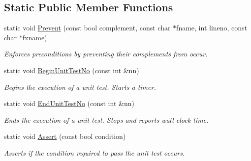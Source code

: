 \subsection*{Static Public Member Functions}
\begin{DoxyCompactItemize}
\item 
static void \hyperlink{classmtk_1_1Tools_afe5bb096309258e2e72503fd7b41c7e0}{Prevent} (const bool complement, const char $\ast$fname, int lineno, const char $\ast$fxname)
\begin{DoxyCompactList}\small\item\em Enforces preconditions by preventing their complements from occur. \end{DoxyCompactList}\item 
static void \hyperlink{classmtk_1_1Tools_a26ee906d28523378522a75e25c3a4e19}{Begin\+Unit\+Test\+No} (const int \&nn)
\begin{DoxyCompactList}\small\item\em Begins the execution of a unit test. Starts a timer. \end{DoxyCompactList}\item 
static void \hyperlink{classmtk_1_1Tools_ad8cf0085133dd40c913fe195bc5b9694}{End\+Unit\+Test\+No} (const int \&nn)
\begin{DoxyCompactList}\small\item\em Ends the execution of a unit test. Stops and reports wall-\/clock time. \end{DoxyCompactList}\item 
static void \hyperlink{classmtk_1_1Tools_aa311fada9255627d06c56b1e4fedce9e}{Assert} (const bool condition)
\begin{DoxyCompactList}\small\item\em Asserts if the condition required to pass the unit test occurs. \end{DoxyCompactList}\end{DoxyCompactItemize}
